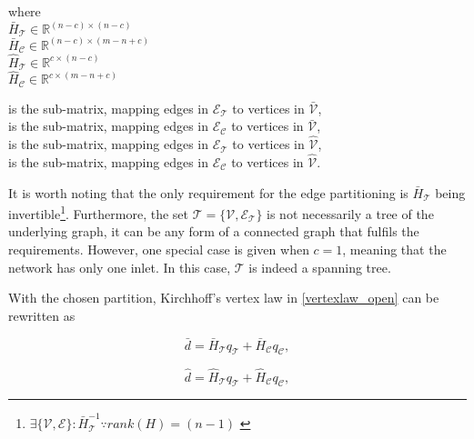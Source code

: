 \begin{minipage}[t]{0.3\textwidth}
where\\
\hspace*{8mm} $\bar{H}_{\mathcal{T}} \in \mathbb{R}^{(n-c) \times (n-c)}$\\ 
\hspace*{8mm} $\bar{H}_{\mathcal{C}} \in \mathbb{R}^{(n-c) \times (m-n+c)}$\\
\hspace*{8mm} $\hat{H}_{\mathcal{T}} \in \mathbb{R}^{c \times (n-c)}$\\
\hspace*{8mm} $\hat{H}_{\mathcal{C}} \in \mathbb{R}^{c \times (m-n+c)}$
\end{minipage}
\begin{minipage}[t]{0.68\textwidth}
\vspace*{-0.1mm}
is the sub-matrix, mapping edges in $\mathcal{E_{\mathcal{T}}}$ to vertices in $\bar{\mathcal{V}}$,\\ 
is the sub-matrix, mapping edges in $\mathcal{E_{\mathcal{C}}}$ to vertices in $\bar{\mathcal{V}}$,\\
is the sub-matrix, mapping edges in $\mathcal{E_{\mathcal{T}}}$ to vertices in $\hat{\mathcal{V}}$,\\
is the sub-matrix, mapping edges in $\mathcal{E_{\mathcal{C}}}$ to vertices in $\hat{\mathcal{V}}$. 
\end{minipage}

It is worth noting that the only requirement for the edge partitioning is $\bar{H}_{\mathcal{T}}$ being invertible\footnote{$\exists \{\mathcal{V}, \mathcal{E} \} : \bar{H}^{-1}_{\mathcal{T}} \because rank(H) = (n-1) $ \cite{deo2017graph} }. Furthermore, the set $\mathcal{T} = \{\mathcal{V}, \mathcal{E_{\mathcal{T}}} \}$ is not necessarily a tree of the underlying graph, it can be any form of a connected graph that fulfils the requirements. However, one special case is given when $c = 1$, meaning that the network has only one inlet. In this case, $\mathcal{T}$ is indeed a spanning tree. 

With the chosen partition, Kirchhoff's vertex law in \eqref{vertexlaw_open} can be rewritten as

\begin{equation}
  \label{vertexlaw_partitioned1}
  \bar{d} = \bar{H}_{\mathcal{T}} q_{\mathcal{T}} + \bar{H}_{\mathcal{C}} q_{\mathcal{C}},
\end{equation}

\begin{equation}
  \label{vertexlaw_partitioned2}
  \hat{d} = \hat{H}_{\mathcal{T}} q_{\mathcal{T}} + \hat{H}_{\mathcal{C}} q_{\mathcal{C}},
\end{equation}

